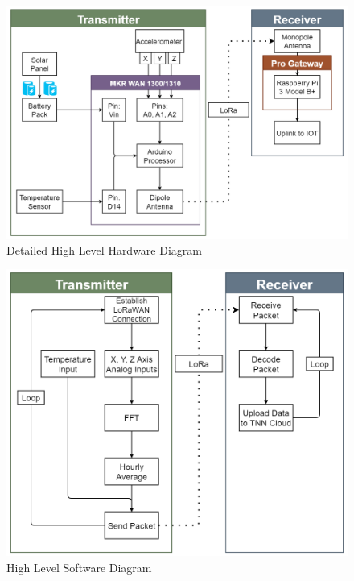 \begin{figure}[h!]
\center
\includegraphics[scale=0.38]{Images/HW-Diagram-Detailed.png}
\caption{Detailed High Level Hardware Diagram}
\label{fig:HL-HW-Diagram-Detailed}
\end{figure}
\clearpage
\begin{figure}[h!]
\center
\includegraphics[scale=0.38]{Images/SW-Diagram.png}
\caption{High Level Software Diagram}
\label{fig:HL-SW-Diagram}
\end{figure}









